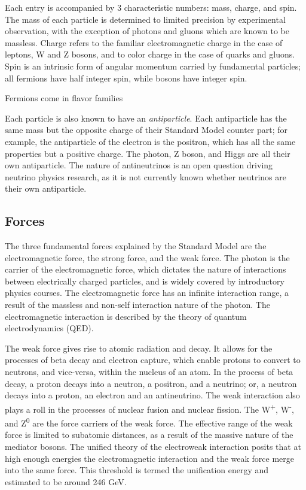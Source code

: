 Each entry is accompanied by 3 characteristic numbers: mass, charge, and spin. The mass of each particle is determined to limited precision by experimental observation, with the exception of photons and gluons which are known to be massless. Charge refers to the familiar electromagnetic charge in the case of leptons, W and Z bosons, and to color charge in the case of quarks and gluons. Spin is an intrinsic form of angular momentum carried by fundamental particles; all fermions have half integer spin, while bosons have integer spin. \par

Fermions come in flavor families

Each particle is also known to have an \textit{antiparticle}. Each antiparticle has the same mass but the opposite charge of their Standard Model counter part; for example, the antiparticle of the electron is the positron, which has all the same properties but a positive charge. The photon, Z boson, and Higgs are all their own antiparticle. The nature of antineutrinos is an open question driving neutrino physics research, as it is not currently known whether neutrinos are their own antiparticle. \par

\subsection{Forces}
The three fundamental forces explained by the Standard Model are the electromagnetic force, the strong force, and the weak force. The photon is the carrier of the electromagnetic force, which dictates the nature of interactions between electrically charged particles, and is widely covered by introductory physics courses. The electromagnetic force has an infinite interaction range, a result of the massless and non-self interaction nature of the photon. The electromagnetic interaction is described by the theory of quantum electrodynamics (QED).\par

The weak force gives rise to atomic radiation and decay. It allows for the processes of beta decay and electron capture, which enable protons to convert to neutrons, and vice-versa, within the nucleus of an atom. In the process of beta decay, a proton decays into a neutron, a positron, and a neutrino; or, a neutron decays into a proton, an electron and an antineutrino. The weak interaction also plays a roll in the processes of nuclear fusion and nuclear fission. The  W\textsuperscript{+}, W\textsuperscript{-}, and Z\textsuperscript{0} are the force carriers of the weak force. The effective range of the weak force is limited to subatomic distances, as a result of the massive nature of the mediator bosons. The unified theory of the electroweak interaction posits that at high enough energies the electromagnetic interaction and the weak force merge into the same force. This threshold is termed the unification energy and estimated to be around 246 GeV. \par

